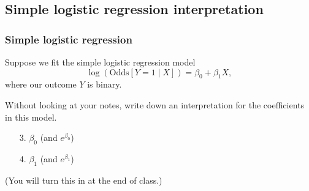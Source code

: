 \documentclass[12pt, 
hyperref={colorlinks=true, linkcolor=blue, urlcolor=cyan}]{beamer}
\begin{document}
\subsection{Simple logistic regression interpretation}
\begin{frame}
\frametitle{Simple logistic regression}
Suppose we fit the simple logistic regression model $$\log\left(\text{Odds}[Y =1 \mid X]\right) = \beta_0 + \beta_1 X,$$ where our outcome $Y$ is binary.

\color{orange} Without looking at your notes, \color{black} write down an interpretation for the coefficients in this model.

\begin{enumerate}
\item[3.] $\beta_0$ (and $e^{\beta_0}$)
\item[4.] $\beta_1$  (and $e^{\beta_1}$)
\end{enumerate} 

(You will turn this in at the end of class.)
\end{frame}
\end{document}
